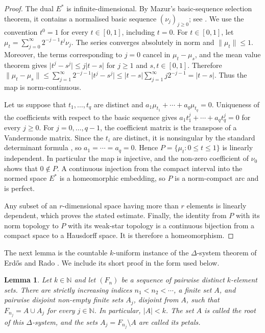 \documentclass[10pt,a4paper]{amsart}
\newtheorem{lemma}[theorem]{Lemma}
\newcommand{\N}{\mathbb{N}}
\newcommand{\abs}[1]{\lvert #1\rvert}
\newcommand{\norm}[1]{\lVert #1\rVert}
\begin{document}
\begin{proof}
The dual $E^*$ is infinite-dimensional.  By Mazur's basic-sequence
selection theorem, it contains a normalised basic sequence
$(\nu_j)_{j\geqslant0}$; see
\cite[Section~1.5]{AlbiacKalton2016}.  We use the convention $t^0=1$
for every $t\in[0,1]$, including $t=0$.  For $t\in[0,1]$, let
$\mu_t=\sum_{j=0}^{\infty}2^{-j-1}t^j\nu_j$.
The series converges absolutely in norm and $\norm{\mu_t}\leqslant1$.
Moreover, the terms corresponding to $j=0$ cancel in
$\mu_t-\mu_s$, and the mean value theorem gives
$\abs{t^j-s^j}\leqslant j\abs{t-s}$ for $j\geqslant1$ and
$s,t\in[0,1]$.  Therefore
$\norm{\mu_t-\mu_s}\leqslant
\sum_{j=1}^{\infty}2^{-j-1}\abs{t^j-s^j}\leqslant
\abs{t-s}\sum_{j=1}^{\infty}j2^{-j-1}=\abs{t-s}$.  Thus the map is
norm-continuous.

Let us suppose that $t_1,\ldots,t_q$ are distinct and
$a_1\mu_{t_1}+\cdots+a_q\mu_{t_q}=0$.
Uniqueness of the coefficients with respect to the basic sequence gives
$a_1t_1^j+\cdots+a_qt_q^j=0$ for every $j\geqslant0$.  For
$j=0,\ldots,q-1$, the coefficient matrix is the transpose of a
Vandermonde matrix.  Since the $t_i$ are distinct, it is nonsingular by
the standard determinant formula
\cite[Section~VM, Theorem~DVM]{Beezer2004}, so
$a_1=\cdots=a_q=0$.  Hence $P=\{\mu_t:0\leqslant t\leqslant1\}$ is
linearly independent.  In particular the map is injective, and
the non-zero coefficient of $\nu_0$ shows that $0\notin P$.  A continuous
injection from the compact interval into the normed space $E^*$ is a
homeomorphic embedding, so $P$ is a norm-compact arc and is perfect.

Any subset of an $r$-dimensional space having more than $r$ elements is
linearly dependent, which proves the stated estimate.  Finally,
the identity from $P$ with its norm topology to $P$ with its weak-star
topology is a continuous bijection from a compact space to a Hausdorff
space.  It is therefore a homeomorphism.
\end{proof}

The next lemma is the countable $k$-uniform instance of the
$\Delta$-system theorem of Erd\H{o}s and Rado
\cite[p.~86]{ErdosRado1960}.  We include its short proof in the form
used below.

\begin{lemma}\label{lem:delta-system}
Let $k\in\N$ and let $(F_n)$ be a sequence of pairwise distinct
$k$-element sets.  There are strictly increasing indices
$n_1<n_2<\cdots$, a finite set $A$, and pairwise disjoint non-empty
finite sets $A_j$, disjoint from $A$, such that
$F_{n_j}=A\cup A_j$ for every $j\in\N$.  In particular, $\abs A<k$.
The set $A$ is called the root of this $\Delta$-system, and the sets
$A_j=F_{n_j}\setminus A$ are called its petals.
\end{lemma}
\end{document}

